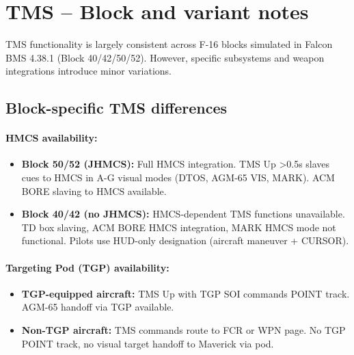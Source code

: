 \documentclass[11pt, a4paper, twoside]{report}
\newenvironment{hotastable}[1]{%
	\small
	\setlength{\tabcolsep}{2pt}
	\renewcommand{\arraystretch}{1.25}
	\begin{longtable}{L{1.00cm} L{0.90cm} L{0.90cm} L{3.30cm} L{6.40cm} L{1.40cm} L{2.10cm}}
		\caption{#1}\\
		\rowcolor{headerblue}
		\multicolumn{1}{>{\centering\arraybackslash}p{1.00cm}}{\textbf{\color{white}Mode}} &
		\multicolumn{1}{>{\centering\arraybackslash}p{0.90cm}}{\textbf{\color{white}Dir.}} &
		\multicolumn{1}{>{\centering\arraybackslash}p{0.90cm}}{\textbf{\color{white}Act.}} &
		\multicolumn{1}{>{\centering\arraybackslash}p{3.30cm}}{\textbf{\color{white}Function}} &
		\multicolumn{1}{>{\centering\arraybackslash}p{6.40cm}}{\textbf{\color{white}Effect / Nuance}} &
		\multicolumn{1}{>{\centering\arraybackslash}p{1.40cm}}{\textbf{\color{white}Dash34}} &
		\multicolumn{1}{>{\centering\arraybackslash}p{2.10cm}}{\textbf{\color{white}Train.}} \\
		\endfirsthead
		\rowcolor{headerblue}
		\multicolumn{1}{>{\centering\arraybackslash}p{1.00cm}}{\textbf{\color{white}Mode}} &
		\multicolumn{1}{>{\centering\arraybackslash}p{0.90cm}}{\textbf{\color{white}Dir.}} &
		\multicolumn{1}{>{\centering\arraybackslash}p{0.90cm}}{\textbf{\color{white}Act.}} &
		\multicolumn{1}{>{\centering\arraybackslash}p{3.30cm}}{\textbf{\color{white}Function}} &
		\multicolumn{1}{>{\centering\arraybackslash}p{6.40cm}}{\textbf{\color{white}Effect / Nuance}} &
		\multicolumn{1}{>{\centering\arraybackslash}p{1.40cm}}{\textbf{\color{white}Dash34}} &
		\multicolumn{1}{>{\centering\arraybackslash}p{2.10cm}}{\textbf{\color{white}Train.}} \\
		\endhead
		\multicolumn{7}{r}{\small\emph{Continued on next page}}\\
		\endfoot
		\endlastfoot
	}{%
	\end{longtable}
}
\begin{document}

\newpage
\section{TMS -- Block and variant notes}
\label{sec:C3-S6}

TMS functionality is largely consistent across F-16 blocks simulated in Falcon BMS 4.38.1 (Block 40/42/50/52). However, specific subsystems and weapon integrations introduce minor variations.

\subsection{Block-specific TMS differences}
\label{sec:C3-S6-S1}

\paragraph{HMCS availability:}
\begin{itemize}
    \item \textbf{Block 50/52 (JHMCS):} Full HMCS integration. TMS Up >0.5s slaves cues to HMCS in A-G visual modes (DTOS, AGM-65 VIS, MARK). ACM BORE slaving to HMCS available.
    \item \textbf{Block 40/42 (no JHMCS):} HMCS-dependent TMS functions unavailable. TD box slaving, ACM BORE HMCS integration, MARK HMCS mode not functional. Pilots use HUD-only designation (aircraft maneuver + CURSOR).
\end{itemize}

\paragraph{Targeting Pod (TGP) availability:}
\begin{itemize}
    \item \textbf{TGP-equipped aircraft:} TMS Up with TGP SOI commands POINT track. AGM-65 handoff via TGP available.
    \item \textbf{Non-TGP aircraft:} TMS commands route to FCR or WPN page. No TGP POINT track, no visual target handoff to Maverick via pod.
\end{itemize}
\end{document}
